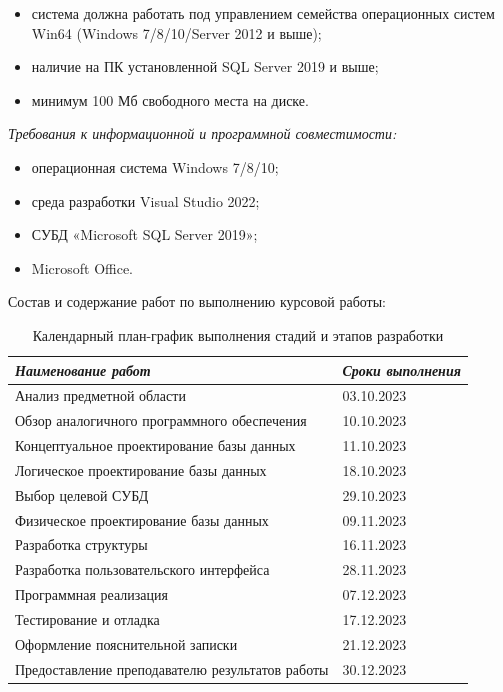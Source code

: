 \documentclass{../SIBGU-state}
\begin{document}
\begin{itemize}
	\item система должна работать под управлением семейства операционных систем Win64 (Windows 7/8/10/Server 2012 и выше);
	\item наличие на ПК установленной SQL Server 2019 и выше;
    \item минимум 100 Мб свободного места на диске.
\end{itemize}\par
\textit{Требования к информационной и программной совместимости:}\par
\begin{itemize}
	\item операционная система Windows 7/8/10;
	\item среда разработки Visual Studio 2022;
    \item СУБД «Microsoft SQL Server 2019»;
    \item Microsoft Office.
\end{itemize}\par\bigskip\bigskip\bigskip

Состав и содержание работ по выполнению курсовой работы:\par
\begin{table}[htb]
	\caption{Календарный план-график выполнения стадий и этапов разработки}
	\centering
	\small\begin{tabular}{ |p{10cm}|p{4.9cm}| }
        \hline
		\textbf{\textit{Наименование работ}} & \textbf{\textit{Сроки выполнения}} \\ \hline
        Анализ предметной области & 03.10.2023 \\ \hline
        Обзор аналогичного программного обеспечения & 10.10.2023\\ \hline
        Концептуальное проектирование базы данных & 11.10.2023\\ \hline
        Логическое проектирование базы данных & 18.10.2023\\ \hline
        Выбор целевой СУБД & 29.10.2023\\ \hline
        Физическое проектирование базы данных & 09.11.2023\\ \hline
        Разработка структуры & 16.11.2023\\ \hline
        Разработка пользовательского интерфейса & 28.11.2023\\ \hline
        Программная реализация & 07.12.2023\\ \hline
        Тестирование и отладка & 17.12.2023\\ \hline
        Оформление пояснительной записки & 21.12.2023\\ \hline
        Предоставление преподавателю результатов работы & 30.12.2023\\ \hline
	\end{tabular}
	\label{tab:in_appendix}
\end{table}\par
\end{document}
